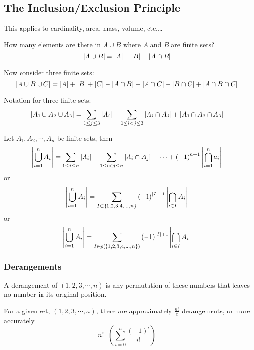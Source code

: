     \subsection{The Inclusion/Exclusion Principle}
    This applies to cardinality, area, mass, volume, etc.\ldots

    How many elements are there in $A \cup B$ where $A$ and $B$ are finite sets?
        \[ \left\lvert A \cup B \right\rvert = \left\lvert A \right\rvert + \left\lvert B \right\rvert - \left\lvert A \cap B \right\rvert \]

    Now consider three finite sets:
        \[ \left\lvert A \cup B \cup C \right\rvert = \left\lvert A \right\rvert + \left\lvert B \right\rvert + \left\lvert C \right\rvert - \left\lvert A \cap B \right\rvert - \left\lvert A \cap C \right\rvert - \left\lvert B \cap C \right\rvert + \left\lvert A \cap B \cap C \right\rvert \]

    Notation for three finite sets:
        \[ \left\lvert A_1 \cup A_2 \cup A_3 \right\rvert = \sum_{1 \le j \le 3} \left\lvert A_i \right\rvert - \sum_{1 \le i < j \le 3} \left\lvert A_i \cap A_j \right\rvert + \left\lvert A_1 \cap A_2 \cap A_3 \right\rvert \]

    \begin{thm}
        Let $A_1, A_2, \cdots, A_n$ be finite sets, then
            \[ \left\lvert \bigcup^n_{i=1} A_i \right\rvert = \sum_{1 \le i \le n} \left\lvert A_i \right\rvert - \sum_{1 \le i < j \le n} \left\lvert A_i \cap A_j \right\rvert + \cdots + {\left( -1 \right)}^{n+1} \left\lvert \bigcap^n_{i=1} a_i \right\rvert \]
        or
            \[ \left\lvert \bigcup^n_{i=1} A_i \right\rvert = \sum_{I \subset \{1, 2, 3, 4, \ldots, n \}} {(-1)}^{\left\lvert I \right\rvert + 1} \left\lvert \bigcap_{i \in I} A_i \right\rvert \]
        or
            \[ \left\lvert \bigcup^n_{i=1} A_i \right\rvert = \sum_{I \in p(\{1, 2, 3, 4, \ldots, n \})} {(-1)}^{\left\lvert I \right\rvert + 1} \left\lvert \bigcap_{i \in I} A_i \right\rvert \]

    \end{thm}

        \subsubsection{Derangements}
        A derangement of $(1, 2, 3, \cdots, n)$ is any permutation of these numbers that leaves no number in its original position.

        For a given set, $(1, 2, 3, \cdots, n)$, there are approximately $\frac{n!}{e}$ derangements, or more accurately
            \[ n! \cdot \left( \sum^n_{i=0} \frac{{\left( -1 \right)}^i}{i!} \right) \]

